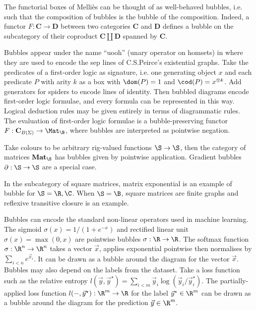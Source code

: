 \begin{example}
The functorial boxes of Melli\`es \cite{Mellies06} can be thought of as
well-behaved bubbles, i.e. such that the composition of bubbles is the
bubble of the composition. Indeed, a functor $F : \mathbf{C} \to \mathbf{D}$
between two categories $\mathbf{C}$ and $\mathbf{D}$ defines a bubble on the
subcategory of their coproduct $\mathbf{C} \coprod \mathbf{D}$ spanned by $\mathbf{C}$.
\end{example}

\begin{example}
Bubbles appear under the name ``uooh'' (unary operator on homsets) in
\cite{HaydonSobocinski20} where they are used to encode the sep lines of
C.S.Peirce's existential graphs.
Take the predicates of a first-order logic as signature, i.e. one
generating object $x$ and each predicate $P$ with arity $k$ as a box with
$\dom(P) = 1$ and $\cod(P) = x^{\otimes k}$. Add generators for spiders to
encode lines of identity.
Then bubbled diagrams encode first-order logic formulae, and every formula can
be represented in this way. Logical deduction rules may be given entirely
in terms of diagrammatic rules.
The evaluation of first-order logic formulae is a bubble-preserving functor
$F : \mathbf{C}_{B(\Sigma)} \to \Mat_\B$, where bubbles are interpreted
as pointwise negation.
\end{example}

\begin{example}
Take colours to be arbitrary rig-valued functions $\S \to \S$, then
the category of matrices $\mathbf{Mat}_\S$ has bubbles given by pointwise
application. Gradient bubbles $\partial : \S \to \S$ are a special case.
\end{example}

\begin{example}
In the subcategory of square matrices, matrix exponential is an example of
bubble for $\S = \R, \C$. When $\S = \B$, square matrices are finite
graphs and reflexive transitive closure is an example.
\end{example}

\begin{example}
Bubbles can encode the standard non-linear operators used in machine learning.
The sigmoid $\sigma(x) = 1 / (1 + e^{-x})$ and rectified linear unit
$\sigma(x) = \max(0, x)$ are pointwise bubbles $\sigma : \R \to \R$.
The softmax function $\sigma : \R^n \to \R^n$ takes a vector $\vec{x}$,
applies exponential pointwise then normalises by $\sum_{i<n} e^{\vec{x}_i}$.
It can be drawn as a bubble around the diagram for the vector $\vec{x}$.
Bubbles may also depend on the labels from the dataset.
Take a loss function such as the relative entropy $l(\vec{y}, \vec{y}^\star)
= \sum_{i < m} \vec{y}_i \log(\vec{y}_i / \vec{y}^\star_i)$.
The partially-applied loss function $l(-, \vec{y}^\star) : \R^m \to \R$ for the
label $\vec{y}^\star \in \R^m$ can be drawn as a bubble around the diagram for
the prediction $\vec{y} \in \R^m$.
\end{example}

